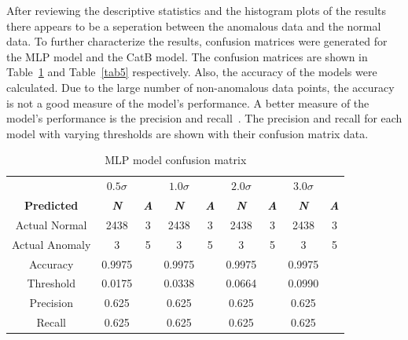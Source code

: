 After reviewing the descriptive statistics and the histogram plots of the results there appears to be a seperation between the anomalous data and the normal data.
To further characterize the results, confusion matrices were generated for the MLP model and the CatB model. The confusion matrices are shown in Table~\ref{tab4} and Table~\ref{tab5} respectively.
Also, the accuracy of the models were calculated. Due to the large number of non-anomalous data points, the accuracy is not a good measure of the model's performance.
A better measure of the model's performance is the precision and recall\ \cite{precision_recall_wiki}. The precision and recall for each model with varying thresholds are shown with their confusion matrix data.

\begin{table}[htbp]
    \caption{MLP model confusion matrix}\label{tab4}
    \begin{center}
        \begin{tabular}{c|cc|cc|cc|cc}
            \toprule 
                & $0.5\sigma$& &  $1.0\sigma$ & & $2.0\sigma$ & & $3.0\sigma$\\           
            \textbf{Predicted}  & \textbf{\textit{N}} & \textbf{\textit{A}}& \textbf{\textit{N}} & \textbf{\textit{A}}& \textbf{\textit{N}} & \textbf{\textit{A}}& \textbf{\textit{N}} & \textbf{\textit{A}}\\
            \midrule
            Actual Normal & 2438 & 3 & 2438 & 3& 2438 & 3& 2438 & 3\\
            Actual Anomaly & 3 & 5 & 3 & 5& 3 & 5& 3 & 5\\
            \midrule
            Accuracy & 0.9975 & & 0.9975 & & 0.9975 & & 0.9975 & \\
            Threshold & 0.0175 & & 0.0338 & & 0.0664 & & 0.0990 & \\
            Precision & 0.625 & & 0.625 & & 0.625 & & 0.625 & \\
            Recall & 0.625 & & 0.625 & & 0.625 & & 0.625 & \\
            \bottomrule
        \end{tabular}
    \end{center}
\end{table}


